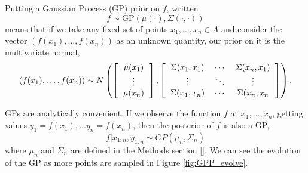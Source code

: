 \documentclass[phd,tocprelim]{cornell}
\begin{document}
Putting a Gaussian Process (GP) prior on $f$, written
\begin{equation}
 f \sim \mbox{GP}(\mu(\cdot), \Sigma(\cdot, \cdot))
\end{equation}
means that if we take any fixed set of points $x_{1}, \ldots, x_{n} \in A$ and consider the vector $(f(x_{1}), \ldots, f(x_{n}))$ as an unknown quantity, our prior on it is the multivariate normal,
\begin{equation}
(f(x_{1}), \ldots, f(x_{n})) \sim N\left( \left[ \begin{tabular}{c} $\mu(x_{1})$ \\ $\vdots$ \\ $\mu(x_{n})$ \end{tabular} \right] , \left[ \begin{tabular}{ccc} $\Sigma(x_{1}, x_{1})$ & $\cdots$ & $\Sigma(x_{n}, x_{1})$ \\ $\vdots$ & $\ddots$ & $\vdots$ \\ $\Sigma(x_{1}, x_{n})$ & $\cdots$ & $\Sigma(x_{n},x_{n}$ \end{tabular} \right] \right).
\end{equation}

GPs are analytically convenient. If we observe the function $f$ at $x_{1}, \ldots, x_{n}$, getting values $y_{1} = f(x_{1}), \ldots y_{n} = f(x_{n})$, then the posterior of $f$ is also a GP,
\begin{equation}
 f|x_{1:n}, y_{1:n} \sim GP(\mu_{n}, \Sigma_{n})
\end{equation}
where $\mu_{n}$ and $\Sigma_{n}$ are defined in the Methods section \ref{}. We can see the evolution of the GP as more points are sampled in Figure \ref{fig:GPP_evolve}.
\end{document}
